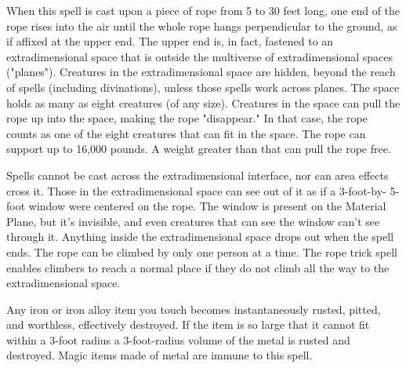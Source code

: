 \begin{multicols}{2}
\begin{small}
\noindent When this spell is cast upon a piece of rope from 5 to 30 feet long, one end of the rope rises into the air until the whole rope hangs perpendicular to the ground, as if affixed at the upper end. The upper end is, in fact, fastened to an extradimensional space that is outside the multiverse of extradimensional spaces ("planes"). Creatures in the extradimensional space are hidden, beyond the reach of spells (including divinations), unless those spells work across planes. The space holds as many as eight creatures (of any size). Creatures in the space can pull the rope up into the space, making the rope "disappear." In that case, the rope counts as one of the eight creatures that can fit in the space. The rope can support up to 16,000 pounds. A weight greater than that can pull the rope free.

\smallskip\noindent Spells cannot be cast across the extradimensional interface, nor can area effects cross it. Those in the extradimensional space can see out of it as if a 3-foot-by- 5-foot window were centered on the rope. The window is present on the Material Plane, but it's invisible, and even creatures that can see the window can't see through it. Anything inside the extradimensional space drops out when the spell ends. The rope can be climbed by only one person at a time. The rope trick spell enables climbers to reach a normal place if they do not climb all the way to the extradimensional space.


\noindent Any iron or iron alloy item you touch becomes instantaneously rusted, pitted, and worthless, effectively destroyed. If the item is so large that it cannot fit within a 3-foot radius a 3-foot-radius volume of the metal is rusted and destroyed. Magic items made of metal are immune to this spell.


\end{small}
\end{multicols}

